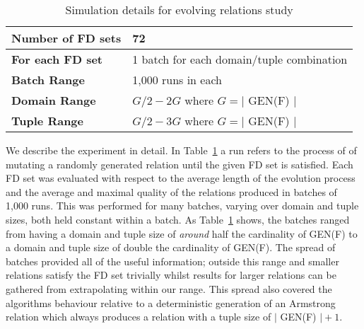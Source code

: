 \medskip

{\line
\begin{table}[ht]
\begin{center}
\begin{tabular}{|l||l|}
\hline
{\bf Number of FD sets}  & 72 \\ \hline
{\bf For each FD set} & 1 batch for each domain/tuple combination\\ \hline
{\bf Batch Range} & 1,000 runs in each \\ \hline
{\bf Domain Range} & $G/2 - 2G$ where $ G = \mid$ GEN(F) $\mid$  \\ \hline
{\bf Tuple Range} & $G/2 - 3G$  where $ G = \mid$ GEN(F) $\mid$  \\ \hline 
\end{tabular}
\end{center}
\caption{\label{table:5.01} Simulation details for evolving relations study}
\end{table}
}


We describe the experiment in detail. In Table~\ref{table:5.01} a
run refers to the process of  of mutating
a randomly generated relation until the given FD set is satisfied.
 Each FD set was evaluated with respect to the average length of the
 evolution process and the average and maximal quality of the relations
 produced in batches of 1,000 runs.
This was performed for many batches, varying over domain and tuple
sizes, both held constant within a batch. As Table~\ref{table:5.01} 
shows, the batches ranged from having a domain and tuple size
of {\em around} half the cardinality of GEN(F) to
a domain and tuple size of double the cardinality of GEN(F).
  The spread of batches provided all of the useful
information; outside this range and smaller relations satisfy the
FD set trivially whilst results for larger relations can be gathered
from extrapolating within our range. This spread also covered the
algorithms behaviour relative to a deterministic generation
of an Armstrong relation which always produces a relation with
a tuple size of $\mid$ GEN(F) $\mid + 1$.
\medskip

